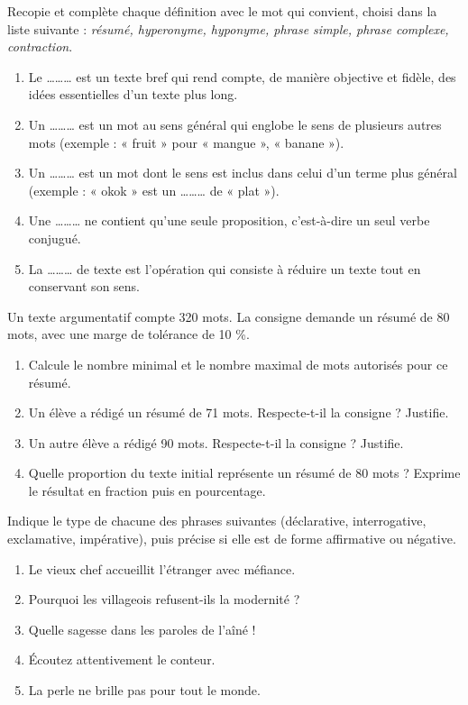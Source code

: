 \documentclass[11pt]{article}
\newcounter{popsec}
\newcounter{popsub}
\newcommand{\courssub}[1]{%
  \stepcounter{popsub}%
  \par\vspace{9pt}\noindent{\popxbold\fontsize{11.5}{13}\selectfont\color{popink}{\color{poporange}\thepopsec.\thepopsub}\hspace{6pt}#1}\par\nopagebreak\vspace{4pt}
}
\begin{document}
\begin{exercice}
Recopie et complète chaque définition avec le mot qui convient, choisi dans la liste suivante : \emph{résumé, hyperonyme, hyponyme, phrase simple, phrase complexe, contraction}.
\begin{enumerate}
\item Le \ldots\ldots\ldots{} est un texte bref qui rend compte, de manière objective et fidèle, des idées essentielles d'un texte plus long.
\item Un \ldots\ldots\ldots{} est un mot au sens général qui englobe le sens de plusieurs autres mots (exemple : « fruit » pour « mangue », « banane »).
\item Un \ldots\ldots\ldots{} est un mot dont le sens est inclus dans celui d'un terme plus général (exemple : « okok » est un \ldots\ldots\ldots{} de « plat »).
\item Une \ldots\ldots\ldots{} ne contient qu'une seule proposition, c'est-à-dire un seul verbe conjugué.
\item La \ldots\ldots\ldots{} de texte est l'opération qui consiste à réduire un texte tout en conservant son sens.
\end{enumerate}
\end{exercice}

\begin{exercice}
Un texte argumentatif compte 320 mots. La consigne demande un résumé de 80 mots, avec une marge de tolérance de 10 \%.
\begin{enumerate}
\item Calcule le nombre minimal et le nombre maximal de mots autorisés pour ce résumé.
\item Un élève a rédigé un résumé de 71 mots. Respecte-t-il la consigne ? Justifie.
\item Un autre élève a rédigé 90 mots. Respecte-t-il la consigne ? Justifie.
\item Quelle proportion du texte initial représente un résumé de 80 mots ? Exprime le résultat en fraction puis en pourcentage.
\end{enumerate}
\end{exercice}

\courssub{Je m'entraîne}

\begin{exercice}
Indique le type de chacune des phrases suivantes (déclarative, interrogative, exclamative, impérative), puis précise si elle est de forme affirmative ou négative.
\begin{enumerate}
\item Le vieux chef accueillit l'étranger avec méfiance.
\item Pourquoi les villageois refusent-ils la modernité ?
\item Quelle sagesse dans les paroles de l'aîné !
\item Écoutez attentivement le conteur.
\item La perle ne brille pas pour tout le monde.
\end{enumerate}
\end{exercice}
\end{document}
